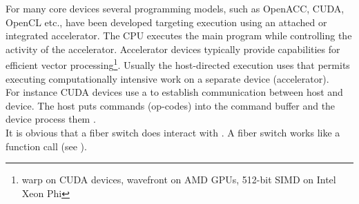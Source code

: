 
For many core devices several programming models, such as OpenACC, CUDA, OpenCL
etc., have been developed targeting  execution using an
attached or integrated accelerator. The CPU executes the main program while
controlling the activity of the accelerator. Accelerator devices typically
provide capabilities for efficient vector processing\footnote{warp on CUDA
devices, wavefront on AMD GPUs, 512-bit SIMD on Intel Xeon Phi}. Usually the
host-directed execution uses  that permits
executing computationally intensive work on a separate device
(accelerator)\cite{OpenAcc}.\\
For instance CUDA devices use a  to establish communication
between host and device. The host puts commands (op-codes) into the command
buffer and the device process them \cite{CUDA}.\\
It is obvious that a fiber switch does  interact with
. A fiber switch works like a function
call (see ).
